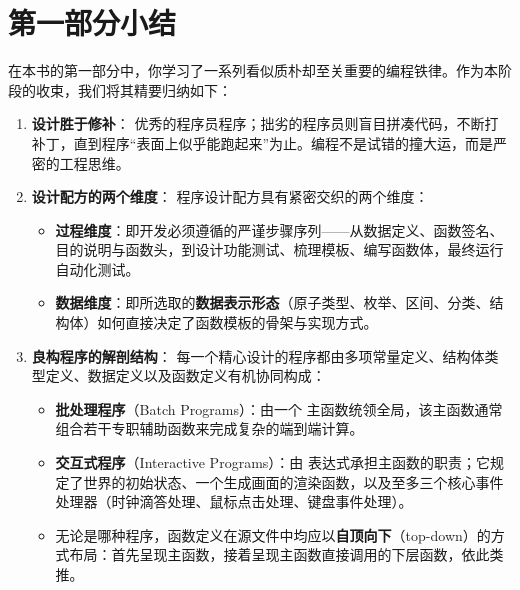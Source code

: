 
\chapter{第一部分小结}
\label{sec:ch07_summary}

在本书的第一部分中，你学习了一系列看似质朴却至关重要的编程铁律。作为本阶段的收束，我们将其精要归纳如下：

\begin{notebox}[第一部分核心心得归纳]
\begin{enumerate}[label=\textbf{\arabic*.}]
  \item \textbf{设计胜于修补}：
    优秀的程序员程序；拙劣的程序员则盲目拼凑代码，不断打补丁，直到程序“表面上似乎能跑起来”为止。编程不是试错的撞大运，而是严密的工程思维。

  \item \textbf{设计配方的两个维度}：
    程序设计配方具有紧密交织的两个维度：
    \begin{itemize}
      \item \textbf{过程维度}：即开发必须遵循的严谨步骤序列——从数据定义、函数签名、目的说明与函数头，到设计功能测试、梳理模板、编写函数体，最终运行自动化测试。
      \item \textbf{数据维度}：即所选取的\textbf{数据表示形态}（原子类型、枚举、区间、分类、结构体）如何直接决定了函数模板的骨架与实现方式。
    \end{itemize}

  \item \textbf{良构程序的解剖结构}：
    每一个精心设计的程序都由多项常量定义、结构体类型定义、数据定义以及函数定义有机协同构成：
    \begin{itemize}
      \item \textbf{批处理程序}（Batch Programs）：由一个  主函数统领全局，该主函数通常组合若干专职辅助函数来完成复杂的端到端计算。
      \item \textbf{交互式程序}（Interactive Programs）：由  表达式承担主函数的职责；它规定了世界的初始状态、一个生成画面的渲染函数，以及至多三个核心事件处理器（时钟滴答处理、鼠标点击处理、键盘事件处理）。
      \item 无论是哪种程序，函数定义在源文件中均应以\textbf{自顶向下}（top-down）的方式布局：首先呈现主函数，接着呈现主函数直接调用的下层函数，依此类推。
    \end{itemize}


\end{enumerate}
\end{notebox}
